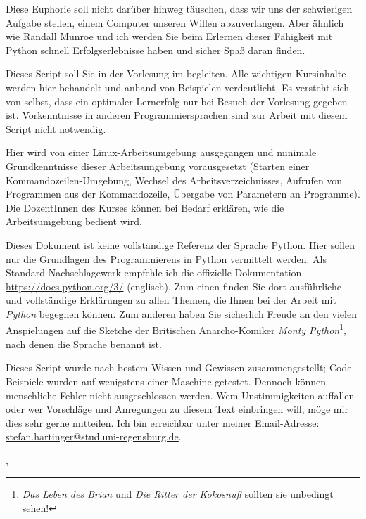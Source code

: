 Diese Euphorie soll nicht darüber hinweg täuschen, dass wir uns der schwierigen Aufgabe stellen, einem Computer unseren Willen abzuverlangen. Aber ähnlich wie Randall Munroe und ich werden Sie beim Erlernen dieser Fähigkeit mit Python schnell Erfolgserlebnisse haben und sicher Spaß daran finden.

Dieses Script soll Sie in der Vorlesung \emph{\myTitle} im \currentPeriod begleiten. Alle wichtigen Kursinhalte werden hier behandelt und anhand von Beispielen verdeutlicht. Es versteht sich von selbst, dass ein optimaler Lernerfolg nur bei Besuch der Vorlesung gegeben ist. Vorkenntnisse in anderen Programmiersprachen sind zur Arbeit mit diesem Script nicht notwendig.

Hier wird von einer Linux-Arbeits\-umgebung ausgegangen und minimale Grundkenntnisse dieser Arbeits\-umgebung vorausgesetzt (Starten einer Kommandozeilen-Umgebung, Wechsel des Arbeitsverzeichnisses, Aufrufen von Programmen aus der Kommandozeile, Übergabe von Parametern an Programme). Die DozentInnen des Kurses können bei Bedarf erklären, wie die Arbeitsumgebung bedient wird.

Dieses Dokument ist keine vollständige Referenz der Sprache Python. Hier sollen nur die Grundlagen des Programmierens in Python vermittelt werden. Als Standard-Nachschlagewerk empfehle ich die offizielle Dokumentation \url{https://docs.python.org/3/} (englisch). Zum einen finden Sie dort ausführliche und vollständige Erklärungen zu allen Themen, die Ihnen bei der Arbeit mit \emph{Python} begegnen können. Zum anderen haben Sie sicherlich Freude an den vielen Anspielungen auf die Sketche der Britischen Anarcho-Komiker \emph{Monty Python}\footnote{\emph{Das Leben des Brian} und \emph{Die Ritter der Kokosnuß}\footnotemark \;
sollten sie unbedingt sehen!}, nach denen die Sprache benannt ist.

Dieses Script wurde nach bestem Wissen und Gewissen zusammengestellt; Code-Beispiele wurden auf wenigstens einer Maschine getestet. Dennoch können menschliche Fehler nicht ausgeschlossen werden. Wem Unstimmigkeiten auffallen oder wer Vorschläge und Anregungen zu diesem Text einbringen will, möge mir dies sehr gerne mitteilen. Ich bin erreichbar unter meiner Email-Adresse:\\ \url{stefan.hartinger@stud.uni-regensburg.de}.
\begin{flushright}
\myName, \myVersionTime
\end{flushright}
